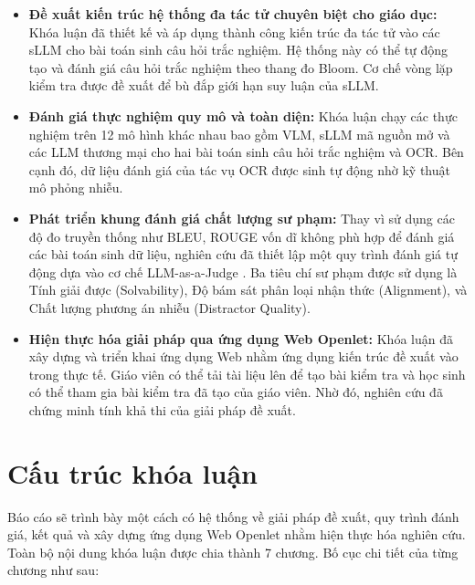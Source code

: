 \begin{itemize}
    \item \textbf{Đề xuất kiến trúc hệ thống đa tác tử chuyên biệt cho giáo dục:} Khóa luận đã thiết kế và áp dụng thành công kiến trúc đa tác tử vào các sLLM cho bài toán sinh câu hỏi trắc nghiệm. Hệ thống này có thể tự động tạo và đánh giá câu hỏi trắc nghiệm theo thang đo Bloom. Cơ chế vòng lặp kiểm tra được đề xuất để bù đắp giới hạn suy luận của sLLM.

    \item \textbf{Đánh giá thực nghiệm quy mô và toàn diện:} Khóa luận chạy các thực nghiệm trên 12 mô hình khác nhau bao gồm VLM, sLLM mã nguồn mở và các LLM thương mại cho hai bài toán sinh câu hỏi trắc nghiệm và OCR. Bên cạnh đó, dữ liệu đánh giá của tác vụ OCR được sinh tự động nhờ kỹ thuật mô phỏng nhiễu.

    \item \textbf{Phát triển khung đánh giá chất lượng sư phạm:} Thay vì sử dụng các độ đo truyền thống như BLEU, ROUGE vốn dĩ không phù hợp để đánh giá các bài toán sinh dữ liệu, nghiên cứu đã thiết lập một quy trình đánh giá tự động dựa vào cơ chế LLM-as-a-Judge \cite{liu2023geval}. Ba tiêu chí sư phạm được sử dụng là Tính giải được (Solvability), Độ bám sát phân loại nhận thức (Alignment), và Chất lượng phương án nhiễu (Distractor Quality).

    \item \textbf{Hiện thực hóa giải pháp qua ứng dụng Web Openlet:} Khóa luận đã xây dựng và triển khai ứng dụng Web nhằm ứng dụng kiến trúc đề xuất vào trong thực tế. Giáo viên có thể tải tài liệu lên để tạo bài kiểm tra và học sinh có thể tham gia bài kiểm tra đã tạo của giáo viên. Nhờ đó, nghiên cứu đã chứng minh tính khả thi của giải pháp đề xuất.
\end{itemize}

\section{Cấu trúc khóa luận}

Báo cáo sẽ trình bày một cách có hệ thống về giải pháp đề xuất, quy trình đánh giá, kết quả và xây dựng ứng dụng Web Openlet nhằm hiện thực hóa nghiên cứu. Toàn bộ nội dung khóa luận được chia thành 7 chương. Bố cục chi tiết của từng chương như sau:

